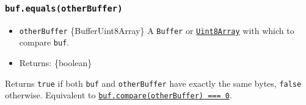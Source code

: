 \subsubsection{\texorpdfstring{\texttt{buf.equals(otherBuffer)}}{buf.equals(otherBuffer)}}\label{buf.equalsotherbuffer}

\begin{itemize}
\tightlist
\item
  \texttt{otherBuffer} \{Buffer\textbar Uint8Array\} A \texttt{Buffer}
  or
  \href{https://developer.mozilla.org/en-US/docs/Web/JavaScript/Reference/Global_Objects/Uint8Array}{\texttt{Uint8Array}}
  with which to compare \texttt{buf}.
\item
  Returns: \{boolean\}
\end{itemize}

Returns \texttt{true} if both \texttt{buf} and \texttt{otherBuffer} have
exactly the same bytes, \texttt{false} otherwise. Equivalent to
\hyperref[bufcomparetarget-targetstart-targetend-sourcestart-sourceend]{\texttt{buf.compare(otherBuffer)\ ===\ 0}}.

\begin{Shaded}
\begin{Highlighting}[]
\NormalTok{ \{ }\NormalTok{ \} } \OperatorTok{;}

\OperatorTok{=} \NormalTok{(}\NormalTok{)}\OperatorTok{;}
\OperatorTok{=} \NormalTok{(}\StringTok{\textquotesingle{}414243\textquotesingle{}}\OperatorTok{,} \NormalTok{)}\OperatorTok{;}
\OperatorTok{=} \NormalTok{(}\NormalTok{)}\OperatorTok{;}

\OperatorTok{;}
\OperatorTok{;}
\end{Highlighting}
\end{Shaded}

